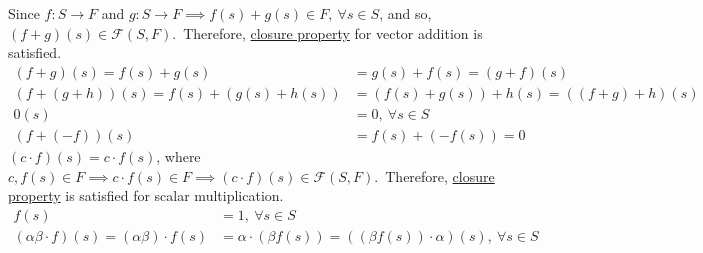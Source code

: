 \documentclass[12pt]{ipu-math}
\begin{document}
    \\~

    \solution
    Since $f:S\rightarrow F$ and $g:S\rightarrow F \implies f(s) + g(s) \in F,~ \forall s \in S$, and so,
    $(f+g)(s) \in \mathcal{F}(S,F)$.\ Therefore, \underline{closure property} for vector addition is satisfied.
    \begin{align*}
    (f+g)(s)
        = f(s) + g(s) &= g(s) + f(s) = (g+f)(s)\tag{Commutativity}\\
        (f+(g+h))(s) = f(s) + (g(s) + h(s)) &= (f(s) + g(s)) + h(s) = ((f+g)+h)(s)\tag{Associativity}\\
        0(s) &= 0,~\forall s \in S\tag{Additive Identity}\\
        (f+(-f))(s) &= f(s) + (-f(s)) = 0\tag{Additive Inverse}
    \end{align*}%
    $(c\cdot{f})(s) = c\cdot{f(s)}$, where
    $c,f(s) \in F \implies c\cdot{f(s)} \in F \implies (c\cdot f)(s) \in \mathcal{F}(S,F)$.\ Therefore,
    \underline{closure property} is satisfied for scalar multiplication.%
    \begin{align*}
        f(s) &= 1,~\forall s \in S\tag{Multiplicative Identity}\\
        (\alpha\beta\cdot{f})(s) = (\alpha\beta)\cdot{f(s)}
        &= \alpha\cdot(\beta f(s)) = ((\beta f(s))\cdot\alpha)(s),~\forall s \in S\tag{Associativity}\\
    \end{align*}
\end{document}

